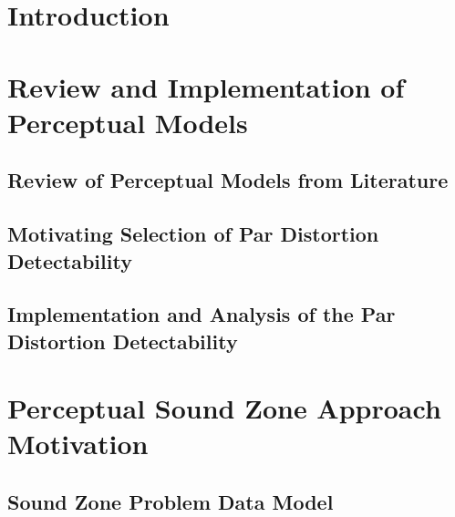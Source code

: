 \documentclass[10pt,twoside,openright,titlepage]{ce}
\begin{document}
\frontmatter
\makecover
\maketitle
\makesignature


\tableofcontents
\mainmatter

\chapter{Introduction}
\label{ch:introduction}

\newpage


\chapter{Review and Implementation of Perceptual Models}
\label{ch:perceptual}

\newpage
\section{Review of Perceptual Models from Literature}
\label{ch:perceptual:review}

\newpage
\section{Motivating Selection of Par Distortion Detectability}
\label{ch:perceptual:selection}

\newpage
\section{Implementation and Analysis of the Par Distortion Detectability}
\label{ch:perceptual:implementation}

\newpage

\chapter{Perceptual Sound Zone Approach Motivation}
\label{ch:sound_zone}

\newpage
\section{Sound Zone Problem Data Model}
\label{ch:sound_zone:data_model}

\newpage
\end{document}
